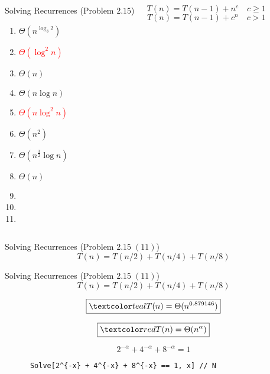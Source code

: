 \begin{frame}{}
  \begin{columns}
      \begin{exampleblock}{Solving Recurrences (Problem $2.15$)}
	\begin{enumerate}[(1)]
	  \item $\Theta(n^{\log_3 2})$
	  \item \textcolor{red}{$\Theta(\log^2 n)$}
	  \item $\Theta(n)$
	  \item $\Theta(n \log n)$
	  \item \textcolor{red}{$\Theta(n \log^2 n)$}
	  \item $\Theta(n^2)$
	  \item $\Theta(n^{\frac{3}{2}}\log n)$
	  \item $\Theta(n)$
	  \item {}
	  \item {}
	  \item \purple{$\cdots$}
	\end{enumerate}
      \end{exampleblock}
      \[
	T(n) = T(n-1) + n^c \quad c \ge 1
      \]
      \[
	T(n) = T(n-1) + c^n \quad c > 1
      \]
  \end{columns}
\end{frame}

\begin{frame}[fragile]{}
  \begin{exampleblock}{Solving Recurrences (Problem $2.15\; (11)$)}
    \[
      T(n) = T(n/2) + T(n/4) + T(n/8)
    \]
  \end{exampleblock}

  \vspace{0.50cm}
\end{frame}

\begin{frame}[fragile]{}
  \begin{exampleblock}{Solving Recurrences (Problem $2.15\; (11)$)}
    \[
      T(n) = T(n/2) + T(n/4) + T(n/8)
    \]
  \end{exampleblock}

  \pause
  \vspace{0.30cm}
  \[
    \boxed{\teal{T(n) = \Theta(n^{0.879146})}}
  \]

  \pause
  \vspace{0.30cm}
  \[
    \boxed{\red{T(n) = \Theta(n^\alpha)}}
  \]

  \pause
  \vspace{0.30cm}
  \[
    2^{-\alpha} + 4^{-\alpha} + 8^{-\alpha} = 1
  \]

  \pause
  \vspace{0.30cm}
  \begin{center}
    \begin{verbatim}
      Solve[2^{-x} + 4^{-x} + 8^{-x} == 1, x] // N
    \end{verbatim}
  \end{center}
\end{frame}

